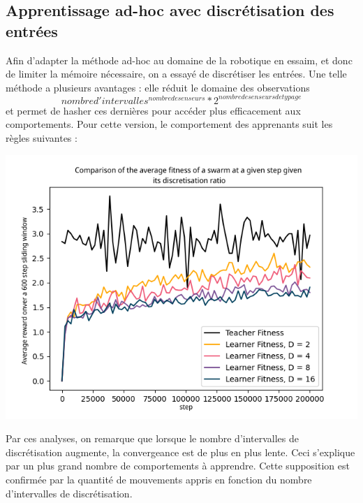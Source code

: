 \documentclass[a4paper, 12pt]{report}
\begin{document}
	\subsection{Apprentissage ad-hoc avec discrétisation des entrées}
	Afin d'adapter la méthode ad-hoc au domaine de la robotique en essaim, et donc de limiter la mémoire nécessaire, on a essayé de discrétiser les entrées. Une telle méthode a plusieurs avantages : elle réduit le domaine des observations $$nombre d'intervalles^{nombre de senseurs}*2^{nombre de senseurs de typage} $$ et permet de hasher ces dernières pour accéder plus efficacement aux comportements.
	Pour cette version, le comportement des apprenants suit les règles suivantes :
	
	
	
\includegraphics{averageComparisons}


	Par ces analyses, on remarque que lorsque le nombre d'intervalles de discrétisation augmente, la convergeance est de plus en plus lente. Ceci s'explique par un plus grand nombre de comportements à apprendre.
	 Cette supposition est confirmée par la quantité de mouvements appris en fonction du nombre d'intervalles de discrétisation.
\end{document}
